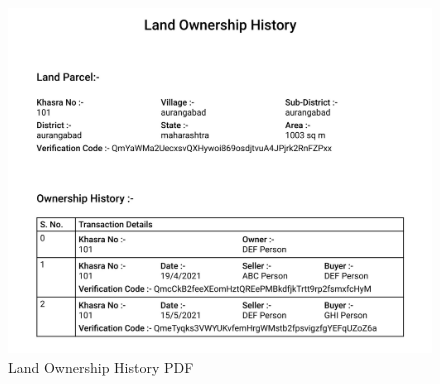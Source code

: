 \documentclass[12pt]{article}
\begin{document}
        \begin{figure}[H]
                \includegraphics[scale=0.25]{landRecord.png}
                \centering
                \caption{Land Ownership History PDF}
                \label{fig:pdfreport}
        \end{figure}
        
\end{document}
